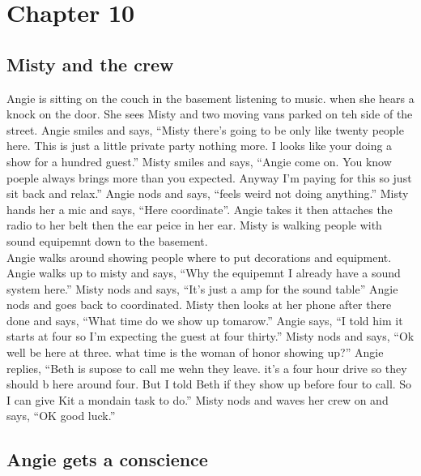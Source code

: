 \documentclass {article}[12pt]
\begin{document}
\section* {Chapter 10}
\subsection* {Misty and the crew}
Angie is sitting on the couch in the basement listening to music. when she hears a knock on the door. She sees Misty and two moving vans parked on teh side of the street. Angie smiles and says, ``Misty there's going to be only like twenty people here. This is just a little private party nothing more. I looks like your doing a show for a hundred guest.'' Misty smiles and says, ``Angie come on. You know poeple always brings more than you expected. Anyway I'm paying for this so just sit back and relax.'' Angie nods and says, ``feels weird not doing anything.'' Misty hands her a mic and says, ``Here coordinate''.  Angie takes it then attaches the radio to her belt then the ear peice in her ear. Misty is walking people with sound equipemnt down to the basement.\\

	Angie walks around showing people where to put decorations and equipment. Angie walks up to misty and says, ``Why the equipemnt I already have a sound system here.'' Misty nods and says, ``It's just a amp for the sound table'' Angie nods and goes back to coordinated. Misty then looks at her phone after there done and says, ``What time do we show up tomarow.'' Angie says, ``I told him it starts at four so I'm expecting the guest at four thirty.'' Misty nods and says, ``Ok well be here at three. what time is the woman of honor showing up?'' Angie replies, ``Beth is supose to call me wehn they leave. it's a four hour drive so they should b here around four. But I told Beth if they show up before four to call. So I can give Kit a mondain task to do.'' Misty nods and waves her crew on and says, ``OK good luck.''\\
	
\subsection* {Angie gets a conscience}
	
\end{document}
